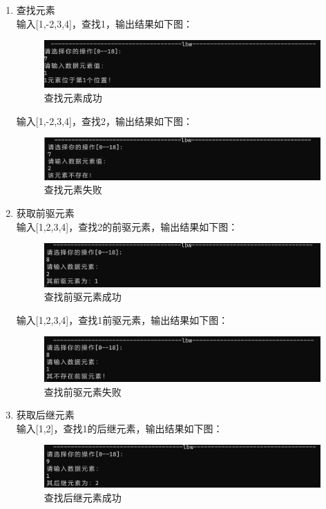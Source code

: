 \documentclass[supercite]{Experimental_Report}
\theoremstyle{definition}
\begin{document}
\begin{enumerate}
		\item 查找元素\\
		输入[1,-2,3,4]，查找1，输出结果如下图：
		\begin{figure}[H]
			\centering
			\includegraphics[width=1\linewidth]{images/定位元素成功.png}
			\caption{查找元素成功}
			\label{fig1-19}
		\end{figure}
		输入[1,-2,3,4]，查找2，输出结果如下图：
		
		\begin{figure}[H]
			\centering
			\includegraphics[width=1\linewidth]{images/定位元素失败.png}
			\caption{查找元素失败}
			\label{fig1-20}
		\end{figure}
		\item 获取前驱元素\\
		输入[1,2,3,4]，查找2的前驱元素，输出结果如下图：
		\begin{figure}[H]
			\centering
			\includegraphics[width=1\linewidth]{images/前驱元素存在.png}
			\caption{查找前驱元素成功}
			\label{fig1-21}
		\end{figure}
		输入[1,2,3,4]，查找1前驱元素，输出结果如下图：
		\begin{figure}[H]
			\centering
			\includegraphics[width=1\linewidth]{images/前驱元素不存在.png}
			\caption{查找前驱元素失败}
			\label{fig1-22}
		\end{figure}
		\item 获取后继元素\\
		输入[1,2]，查找1的后继元素，输出结果如下图：
		\begin{figure}[htbp]
			\centering
			\includegraphics[width=1\linewidth]{images/后继元素存在.png}
			\caption{查找后继元素成功}
			\label{fig1-23}
		\end{figure}
	

\end{enumerate}
\end{document}
